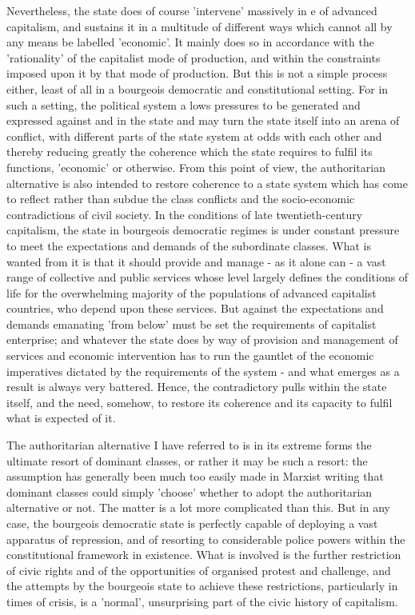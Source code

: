 Nevertheless, the state does of course 'intervene' massively in e of advanced capitalism, and sustains it in a multitude of different ways which cannot all by any means be labelled 'economic'. It mainly does so in accordance with the 'rationality' of the capitalist mode of production, and within the constraints imposed upon it by that mode of production. But this is not a simple process either, least of all in a bourgeois democratic and constitutional setting. For in such a setting, the political system a lows pressures to be generated and expressed against and in the state and may turn the state itself into an arena of conflict, with different parts of the state system at odds with each other and thereby reducing greatly the coherence which the state requires to fulfil its functions, 'economic' or otherwise. From this point of view, the authoritarian alternative is also intended  to restore coherence to a state system which has come to reflect rather than subdue the class conflicts and the socio-economic contradictions of civil society. In the conditions of late twentieth-century capitalism, the state in bourgeois democratic regimes is under constant pressure to meet the expectations and demands of the subordinate classes. What is wanted from it is that it should provide and manage - as it alone can - a vast range of collective and public services whose level largely defines the conditions of life for the overwhelming majority of the populations of advanced capitalist countries, who depend upon these services. But against the expectations and demands emanating 'from below' must be set the requirements of capitalist enterprise; and whatever the state does by way of provision and management of services and economic intervention has to run the gauntlet of the economic imperatives dictated by the requirements of the system - and what emerges as a result is always very battered. Hence, the contradictory pulls within the state itself, and the need, somehow, to restore its coherence and its capacity to fulfil what is expected of it.

The authoritarian alternative I have referred to is in its extreme forms the ultimate resort of dominant classes, or rather it may be such a resort: the assumption has generally been much too easily made in Marxist writing that dominant classes could simply 'choose' whether to adopt the authoritarian alternative or not. The matter is a lot more complicated than this. But in any case, the bourgeois democratic state is perfectly capable of deploying a vast apparatus of repression, and of resorting to considerable police powers within the constitutional framework in existence. What is involved is the further restriction of civic rights and of the opportunities of organised protest and challenge, and the attempts by the bourgeois state to achieve these restrictions, particularly in times of crisis, is a 'normal', unsurprising part of the civic history of capitalism.

